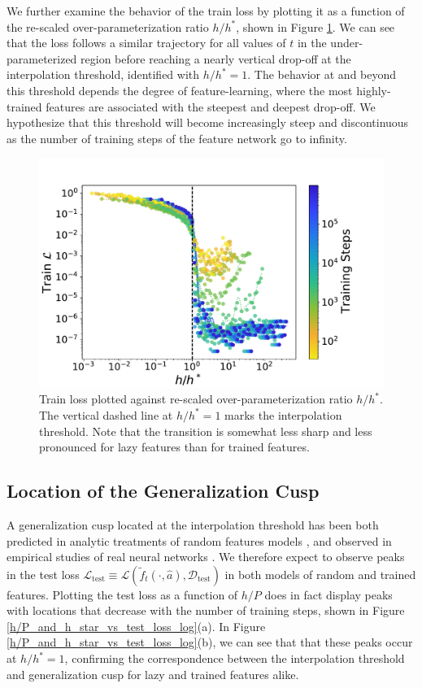 \documentclass[11pt]{article}
\begin{document}
We further examine the behavior of the train loss by plotting it as a function of the re-scaled over-parameterization ratio $h/h^*$, shown in Figure \ref{h/h_star_vs_train_loss_log}. We can see that the loss follows a similar trajectory for all values of $t$ in the under-parameterized region before reaching a nearly vertical drop-off at the interpolation threshold, identified with $h/h^*=1$. The behavior at and beyond this threshold depends the degree of feature-learning, where the most highly-trained features are associated with the steepest and deepest drop-off. We hypothesize that this threshold will become increasingly steep and discontinuous as the number of training steps of the feature network go to infinity. \\

\begin{figure}[!h]
\centering
\captionsetup{width=.8\linewidth}
\centering
\includegraphics[width=.8\linewidth]{docs/assets/h_h_star_vs_train_loss_L=1_log.pdf}
\caption{Train loss plotted against re-scaled over-parameterization ratio $h/h^*$. The vertical dashed line at $h/h^*=1$ marks the interpolation threshold. Note that the transition is somewhat less sharp and less pronounced for lazy features than for trained features.}
\label{h/h_star_vs_train_loss_log}
\end{figure}

\subsection{Location of the Generalization Cusp}
A generalization cusp located at the interpolation threshold has been both predicted in analytic treatments of random features models \cite{meiGeneralizationErrorRandom2019}, \cite{dengModelDoubleDescent2020} and observed in empirical studies of real neural networks \cite{geigerJammingTransitionParadigm2019,spiglerJammingTransitionOverparametrization2019}. We therefore expect to observe peaks in the test loss $\mathcal L_\text{test} \equiv \mathcal L (\tilde f_t(\cdot, \hat 
a), \mathcal D_\text{test})$ in both models of random and trained features. Plotting the test loss as a function of $h/P$ does in fact display peaks with locations that decrease with the number of training steps, shown in Figure \ref{h/P_and_h_star_vs_test_loss_log}(a). In Figure \ref{h/P_and_h_star_vs_test_loss_log}(b), we can see that that these peaks occur at $h/h^*=1$, confirming the correspondence between the interpolation threshold and generalization cusp for lazy and trained features alike.
\end{document}
